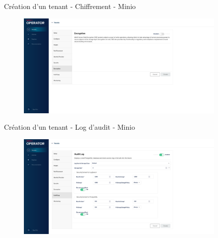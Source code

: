 \begin{frame}[fragile]{Création d'un tenant - Chiffrement - Minio}

\begin{figure}
\begin{center}
\includegraphics[angle=0, width=0.9\textwidth, height=0.9\textheight]{images/encryption_minio.eps}
\end{center}
\end{figure}

\end{frame}


\begin{frame}[fragile]{Création d'un tenant - Log d'audit - Minio}

\begin{figure}
\begin{center}
\includegraphics[angle=0, width=0.9\textwidth, height=0.9\textheight]{images/auditlog_minio.eps}
\end{center}
\end{figure}

\end{frame}


